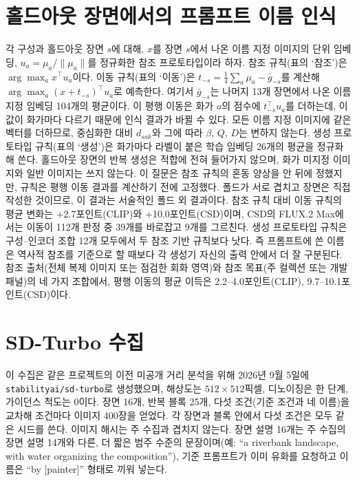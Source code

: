 \FloatBarrier
\section{홀드아웃 장면에서의 프롬프트 이름 인식}\label{app:transfer}



각 구성과 홀드아웃 장면 $s$에 대해, $x$를 장면 $s$에서 나온 이름 지정 이미지의 단위 임베딩,
$u_a=\mu_a/\|\mu_a\|$를 정규화한 참조 프로토타입이라 하자. 참조 규칙(표의 `참조')은 $\arg\max_a x^\top u_a$이다.
이동 규칙(표의 `이동')은 $t_{-s}=\frac14\sum_a\mu_a-\bar g_{-s}$를 계산해 $\arg\max_a(x+t_{-s})^\top u_a$로
예측한다. 여기서 $\bar g_{-s}$는 나머지 13개 장면에서 나온 이름 지정 임베딩 104개의 평균이다. 이 평행
이동은 화가 $a$의 점수에 $t_{-s}^\top u_a$를 더하는데, 이 값이 화가마다 다르기 때문에 인식 결과가 바뀔
수 있다. 모든 이름 지정 이미지에 같은 벡터를 더하므로, 중심화한 대비 $d_{sak}$와 그에 따라 $\beta$,
$Q$, $D$는 변하지 않는다. 생성 프로토타입 규칙(표의 `생성')은 화가마다 라벨이 붙은 학습 임베딩 26개의 평균을
정규화해 쓴다. 홀드아웃 장면의 반복 생성은 적합에 전혀 들어가지 않으며, 화가 미지정 이미지와 일반
이미지는 쓰지 않는다. 이 질문은 참조 규칙의 혼동 양상을 안 뒤에 정했지만, 규칙은 평행 이동 결과를
계산하기 전에 고정했다. 폴드가 서로 겹치고 장면은 직접 작성한 것이므로, 이 결과는 서술적인 폴드 외
결과이다. 참조 규칙 대비 이동 규칙의 평균 변화는 +2.7포인트(CLIP)와 +10.0포인트(CSD)이며, CSD의
FLUX.2 Max에서는 이동이 112개 판정 중 39개를 바로잡고 9개를 그르친다. 생성 프로토타입 규칙은
구성--인코더 조합 12개 모두에서 두 참조 기반 규칙보다 낫다. 즉 프롬프트에 쓴 이름은 역사적 참조를
기준으로 할 때보다 각 생성기 자신의 출력 안에서 더 잘 구분된다. 참조 출처(전체 복제 이미지 또는 점검한
회화 영역)와 참조 목표(주 컬렉션 또는 개발 패널)의 네 가지 조합에서, 평행 이동의 평균 이득은
2.2--4.0포인트(CLIP), 9.7--10.1포인트(CSD)이다.

\FloatBarrier
\section{SD-Turbo 수집}\label{app:sdturbo}

이 수집은 같은 프로젝트의 이전 미공개 거리 분석을 위해 2026년 9월 5일에 \texttt{stabilityai/sd-turbo}로
생성했으며, 해상도는 $512\times512$픽셀, 디노이징은 한 단계, 가이던스 척도는 0이다. 장면 16개, 반복
블록 25개, 다섯 조건(기준 조건과 네 이름)을 교차해 조건마다 이미지 400장을 얻었다. 각 장면과 블록
안에서 다섯 조건은 모두 같은 시드를 쓴다. 이미지 해시는 주 수집과 겹치지 않는다. 장면 설명 16개는 주
수집의 장면 설명 14개와 다른, 더 짧은 범주 수준의 문장이며(예: ``a riverbank landscape, with water
organizing the composition''), 기준 프롬프트가 이미 유화를 요청하고 이름은 ``by [painter]'' 형태로
끼워 넣는다.


